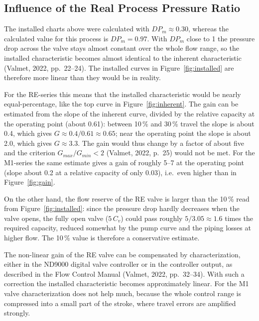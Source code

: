 \documentclass[12pt,a4paper]{article}
\begin{document}
\subsection{Influence of the Real Process Pressure Ratio}
\label{sec:dpm}
The installed charts above were calculated with $DP_m \approx 0.30$, whereas the calculated value for this process is $DP_m = 0.97$. With $DP_m$ close to 1 the pressure drop across the valve stays almost constant over the whole flow range, so the installed characteristic becomes almost identical to the inherent characteristic (Valmet, 2022, pp.~22--24). The installed curves in Figure~\ref{fig:installed} are therefore more linear than they would be in reality.

For the RE-series this means that the installed characteristic would be nearly equal-percentage, like the top curve in Figure~\ref{fig:inherent}. The gain can be estimated from the slope of the inherent curve, divided by the relative capacity at the operating point (about 0.61): between 10\,\% and 30\,\% travel the slope is about 0.4, which gives $G \approx 0.4/0.61 \approx 0.65$; near the operating point the slope is about 2.0, which gives $G \approx 3.3$. The gain would thus change by a factor of about five and the criterion $G_{max}/G_{min} < 2$ (Valmet, 2022, p.~25) would not be met. For the M1-series the same estimate gives a gain of roughly 5--7 at the operating point (slope about 0.2 at a relative capacity of only 0.03), i.e.\ even higher than in Figure~\ref{fig:gain}.

On the other hand, the flow reserve of the RE valve is larger than the 10\,\% read from Figure~\ref{fig:installed}: since the pressure drop hardly decreases when the valve opens, the fully open valve ($5\,C_v$) could pass roughly $5/3.05 \approx 1.6$ times the required capacity, reduced somewhat by the pump curve and the piping losses at higher flow. The 10\,\% value is therefore a conservative estimate.

The non-linear gain of the RE valve can be compensated by characterization, either in the ND9000 digital valve controller or in the controller output, as described in the Flow Control Manual (Valmet, 2022, pp.~32--34). With such a correction the installed characteristic becomes approximately linear. For the M1 valve characterization does not help much, because the whole control range is compressed into a small part of the stroke, where travel errors are amplified strongly.

\end{document}
